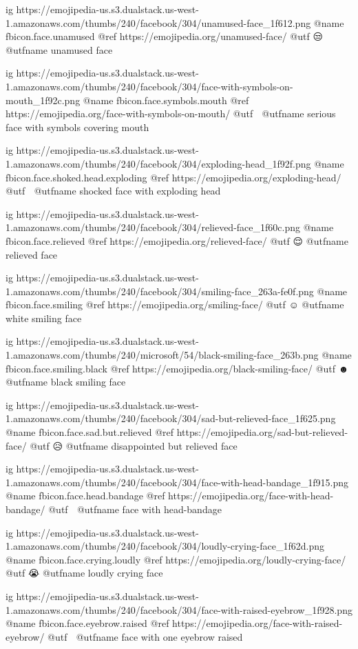   ig https://emojipedia-us.s3.dualstack.us-west-1.amazonaws.com/thumbs/240/facebook/304/unamused-face_1f612.png
  @name fbicon.face.unamused
  @ref https://emojipedia.org/unamused-face/
  @utf 😒
  @utfname unamused face

  ig https://emojipedia-us.s3.dualstack.us-west-1.amazonaws.com/thumbs/240/facebook/304/face-with-symbols-on-mouth_1f92c.png
  @name fbicon.face.symbols.mouth
  @ref https://emojipedia.org/face-with-symbols-on-mouth/
  @utf 🤬
  @utfname serious face with symbols covering mouth

  ig https://emojipedia-us.s3.dualstack.us-west-1.amazonaws.com/thumbs/240/facebook/304/exploding-head_1f92f.png
  @name fbicon.face.shoked.head.exploding
  @ref https://emojipedia.org/exploding-head/
  @utf 🤯
  @utfname shocked face with exploding head

	ig https://emojipedia-us.s3.dualstack.us-west-1.amazonaws.com/thumbs/240/facebook/304/relieved-face_1f60c.png
	@name fbicon.face.relieved
	@ref https://emojipedia.org/relieved-face/
	@utf 😌
	@utfname relieved face

	ig https://emojipedia-us.s3.dualstack.us-west-1.amazonaws.com/thumbs/240/facebook/304/smiling-face_263a-fe0f.png
	@name fbicon.face.smiling
	@ref https://emojipedia.org/smiling-face/
	@utf ☺️
	@utfname white smiling face

	ig https://emojipedia-us.s3.dualstack.us-west-1.amazonaws.com/thumbs/240/microsoft/54/black-smiling-face_263b.png
	@name fbicon.face.smiling.black
	@ref https://emojipedia.org/black-smiling-face/
	@utf ☻
	@utfname black smiling face

	ig https://emojipedia-us.s3.dualstack.us-west-1.amazonaws.com/thumbs/240/facebook/304/sad-but-relieved-face_1f625.png
	@name fbicon.face.sad.but.relieved
	@ref https://emojipedia.org/sad-but-relieved-face/
	@utf 😥
	@utfname disappointed but relieved face

	ig https://emojipedia-us.s3.dualstack.us-west-1.amazonaws.com/thumbs/240/facebook/304/face-with-head-bandage_1f915.png
	@name fbicon.face.head.bandage
	@ref https://emojipedia.org/face-with-head-bandage/
	@utf 🤕
	@utfname face with head-bandage

	ig https://emojipedia-us.s3.dualstack.us-west-1.amazonaws.com/thumbs/240/facebook/304/loudly-crying-face_1f62d.png
	@name fbicon.face.crying.loudly
	@ref https://emojipedia.org/loudly-crying-face/
	@utf 😭
	@utfname loudly crying face


	ig https://emojipedia-us.s3.dualstack.us-west-1.amazonaws.com/thumbs/240/facebook/304/face-with-raised-eyebrow_1f928.png
	@name fbicon.face.eyebrow.raised
	@ref https://emojipedia.org/face-with-raised-eyebrow/
	@utf 🤨
	@utfname face with one eyebrow raised

